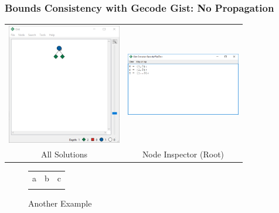 \begin{frame}
  \frametitle{Bounds Consistency with Gecode Gist: No Propagation}
  \begin{tabular}{cc}
    \includegraphics[width=5cm]{../sudoku/images/xyzgistmissing}
    &
    \includegraphics[width=5cm]{../sudoku/images/xyzgistmissinginspector}
    \\
    All Solutions & Node Inspector (Root)
  \end{tabular}
\end{frame}


\begin{figure}[ht]
\caption{Another Example}
\begin{center}
\begin{tabular}{ccc}
a & b & c \\
\begin{tikzpicture}\end{tikzpicture}
&
\begin{tikzpicture}\end{tikzpicture}
&
\begin{tikzpicture}\end{tikzpicture}
\end{tabular}
\end{center}
\end{figure}

